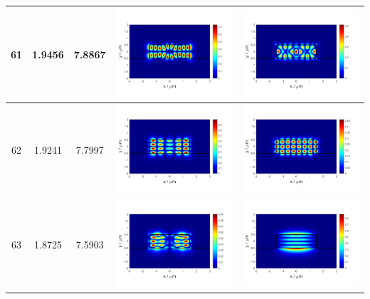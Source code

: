 \documentclass{assignment}
\begin{document}
\begin{sol}
\begin{itemize}
\begin{longtable}[c]{|c|c|c|c|c|}
            61 & 1.9456 & 7.8867 & \includegraphics[width=.3\columnwidth]{Assignment-2-mode-61-Ex.png} & \includegraphics[width=.3\columnwidth]{Assignment-2-mode-61-Ey.png} \\ \hline
            62 & 1.9241 & 7.7997 & \includegraphics[width=.3\columnwidth]{Assignment-2-mode-62-Ex.png} & \includegraphics[width=.3\columnwidth]{Assignment-2-mode-62-Ey.png} \\ \hline
            63 & 1.8725 & 7.5903 & \includegraphics[width=.3\columnwidth]{Assignment-2-mode-63-Ex.png} & \includegraphics[width=.3\columnwidth]{Assignment-2-mode-63-Ey.png} \\ \hline

\end{longtable}
\end{itemize}
\end{sol}
\end{document}
